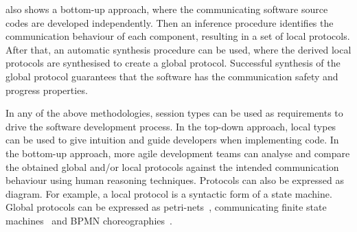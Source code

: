  also shows a bottom-up approach,
where the communicating software source codes are developed independently.
Then an inference  procedure identifies the communication behaviour
of each component, resulting in a set of local protocols.
After that, an automatic synthesis procedure can be used,
where the derived local protocols are synthesised
to create a global protocol. Successful synthesis of the global protocol guarantees that the
software has the communication safety and progress properties.


In any of the above methodologies, session types can be used as
requirements  to drive the software development process.
In the top-down approach, local types can be used to give intuition
and guide developers when implementing code.
In the bottom-up approach, more agile development teams
can analyse and compare the obtained global and/or local protocols
against the intended communication behaviour using human
reasoning techniques. Protocols can also be expressed
as diagram. For example, a local protocol is a syntactic form
of a state machine. Global protocols can be expressed as
petri-nets~\cite{DBLP:conf/tgc/FossatiHY14}, communicating
finite state machines~\cite{Denielou:2012:MST:2259248.2259258}
and BPMN choreographies~\cite{LTY2015}.







